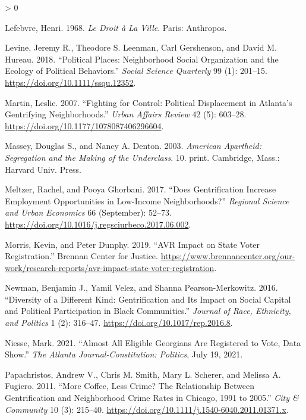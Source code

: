 \documentclass[
  12pt,
]{article}
\newlength{\cslhangindent}
\newenvironment{CSLReferences}[2] %
 {%
  \setlength{\parindent}{0pt}
  \ifodd #1 \everypar{\setlength{\hangindent}{\cslhangindent}}\ignorespaces\fi
  \ifnum #2 > 0
  \setlength{\parskip}{#2\baselineskip}
  \fi
 }%
 {}
\begin{document}
\begin{CSLReferences}{1}{0}
\leavevmode\hypertarget{ref-Lefebvre1968}{}%
Lefebvre, Henri. 1968. \emph{Le {Droit} à La {Ville}}. {Paris}: {Anthropos}.

\leavevmode\hypertarget{ref-Levine2018}{}%
Levine, Jeremy R., Theodore S. Leenman, Carl Gershenson, and David M. Hureau. 2018. {``Political {Places}: {Neighborhood Social Organization} and the {Ecology} of {Political Behaviors}.''} \emph{Social Science Quarterly} 99 (1): 201--15. \url{https://doi.org/10.1111/ssqu.12352}.

\leavevmode\hypertarget{ref-Martin2007a}{}%
Martin, Leslie. 2007. {``Fighting for {Control}: {Political Displacement} in {Atlanta}'s {Gentrifying Neighborhoods}.''} \emph{Urban Affairs Review} 42 (5): 603--28. \url{https://doi.org/10.1177/1078087406296604}.

\leavevmode\hypertarget{ref-Massey2003}{}%
Massey, Douglas S., and Nancy A. Denton. 2003. \emph{American Apartheid: Segregation and the Making of the Underclass}. 10. print. {Cambridge, Mass.}: {Harvard Univ. Press}.

\leavevmode\hypertarget{ref-Meltzer2017}{}%
Meltzer, Rachel, and Pooya Ghorbani. 2017. {``Does Gentrification Increase Employment Opportunities in Low-Income Neighborhoods?''} \emph{Regional Science and Urban Economics} 66 (September): 52--73. \url{https://doi.org/10.1016/j.regsciurbeco.2017.06.002}.

\leavevmode\hypertarget{ref-Morris2019a}{}%
Morris, Kevin, and Peter Dunphy. 2019. {``{AVR Impact} on {State Voter Registration}.''} {Brennan Center for Justice}. \url{https://www.brennancenter.org/our-work/research-reports/avr-impact-state-voter-registration}.

\leavevmode\hypertarget{ref-Newman2016}{}%
Newman, Benjamin J., Yamil Velez, and Shanna Pearson-Merkowitz. 2016. {``Diversity of a {Different Kind}: {Gentrification} and {Its Impact} on {Social Capital} and {Political Participation} in {Black Communities}.''} \emph{Journal of Race, Ethnicity, and Politics} 1 (2): 316--47. \url{https://doi.org/10.1017/rep.2016.8}.

\leavevmode\hypertarget{ref-Niesse2021a}{}%
Niesse, Mark. 2021. {``Almost All Eligible {Georgians} Are Registered to Vote, Data Show.''} \emph{The Atlanta Journal-Constitution: Politics}, July 19, 2021.

\leavevmode\hypertarget{ref-Papachristos2011}{}%
Papachristos, Andrew V., Chris M. Smith, Mary L. Scherer, and Melissa A. Fugiero. 2011. {``More {Coffee}, {Less Crime}? {The Relationship} Between {Gentrification} and {Neighborhood Crime Rates} in {Chicago}, 1991 to 2005.''} \emph{City \& Community} 10 (3): 215--40. \url{https://doi.org/10.1111/j.1540-6040.2011.01371.x}.


\end{CSLReferences}
\end{document}
